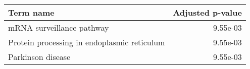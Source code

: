 \begin{tabular}{lr}
\toprule
                                  Term name &  Adjusted p-value \\
\midrule
                  mRNA surveillance pathway &          9.55e-03 \\
Protein processing in endoplasmic reticulum &          9.55e-03 \\
                          Parkinson disease &          9.55e-03 \\
\bottomrule
\end{tabular}
